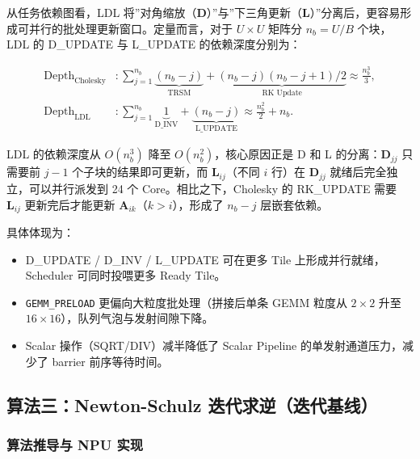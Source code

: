 \documentclass{CjC}
\begin{document}
    从任务依赖图看，LDL 将”对角缩放（$\bm{D}$）”与”下三角更新（$\bm{L}$）”分离后，更容易形成可并行的批处理更新窗口。定量而言，对于
    $U\times U$ 矩阵分 $n_{b}= U/B$ 个块，LDL 的 D\_UPDATE 与 L\_UPDATE
    的依赖深度分别为：

    \begin{equation}
        \begin{aligned}
            \text{Depth}_{\text{Cholesky}} & : \sum_{j=1}^{n_b}\underbrace{(n_b-j)}_{\text{TRSM}}+ \underbrace{(n_b-j)(n_b-j+1)/2}_{\text{RK Update}}\approx \frac{n_b^3}{3}, \\[4pt]
            \text{Depth}_{\text{LDL}}      & : \sum_{j=1}^{n_b}\underbrace{1}_{\text{D\_INV}}+ \underbrace{(n_b-j)}_{\text{L\_UPDATE}}\approx \frac{n_b^2}{2}+ n_{b}.
        \end{aligned}
    \end{equation}

    LDL 的依赖深度从 $O(n_{b}^{3})$ 降至 $O(n_{b}^{2})$，核心原因正是 D 和 L 的分离：$\bm
    {D}_{jj}$
    只需要前 $j-1$ 个子块的结果即可更新，而 $\bm{L}_{ij}$（不同 $i$ 行）在 $\bm{D}
    _{jj}$ 就绪后完全独立，可以并行派发到 24 个 Core。相比之下，Cholesky 的 RK\_UPDATE
    需要 $\bm{L}_{ij}$ 更新完后才能更新 $\bm{A}_{ik}$（$k>i$），形成了 $n_{b}-j$
    层嵌套依赖。

    具体体现为：
    \begin{itemize}
        \item D\_UPDATE / D\_INV / L\_UPDATE 可在更多 Tile 上形成并行就绪，Scheduler
            可同时投喂更多 Ready Tile。

        \item \texttt{GEMM\_PRELOAD} 更偏向大粒度批处理（拼接后单条 GEMM 粒度从
            $2\times2$ 升至 $16\times16$），队列气泡与发射间隙下降。

        \item Scalar 操作（SQRT/DIV）减半降低了 Scalar Pipeline 的单发射通道压力，减少了
            barrier 前序等待时间。
    \end{itemize}


\subsection{算法三：Newton-Schulz 迭代求逆（迭代基线）}
    \label{sec:ns-algo}

    \subsubsection{算法推导与 NPU 实现}
\end{document}
